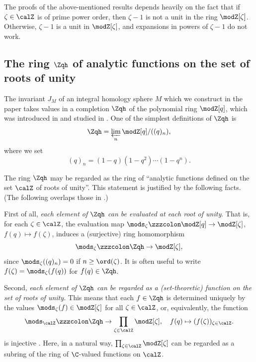 \documentclass{amsart}
\numberwithin{equation}{section}
\numberwithin{figure}{section}
\theoremstyle{plain}
\theoremstyle{definition}
\theoremstyle{remark}
\begin{document}
The proofs of the above-mentioned results depends heavily on the fact
that if $\zeta \in \calZ$ is of prime power order, then $\zeta -1$ is not a unit
in the ring $\modZ [\zeta ]$.  Otherwise, $\zeta -1$ is a unit in $\modZ [\zeta ]$, and
expansions in powers of $\zeta -1$ do not work.

\subsection{The ring $\Zqh$ of analytic functions on the
  set of roots of unity}
\label{sec:ring-zqh-cyclotomic}

The invariant $J_M$ of an integral homology sphere $M$ which we
construct in the paper takes values in a completion $\Zqh$ of the
polynomial ring $\modZ [q]$, which was introduced in \cite{H:rims2001} and
studied in \cite{H:cyclotomic}.  One of the simplest definitions of
$\Zqh$ is
\begin{equation*}
  \Zqh = \varprojlim_{n}\modZ [q]/((q)_n),
\end{equation*}
where we set
\begin{equation*}
  (q)_n = (1-q)(1-q^2)\cdots(1-q^n).
\end{equation*}

The ring $\Zqh$ may be regarded as the ring of ``analytic functions
defined on the set $\calZ$ of roots of unity''.  This statement is
justified by the following facts.  (The following overlaps those in
\cite{H:rims2001,H:cyclotomic}.)

First of all, {\em each element of $\Zqh$ can be evaluated at each
root of unity}.  That is, for each $\zeta \in \calZ$, the evaluation map
$\mods _\zeta \zzzcolon \modZ [q]\rightarrow \modZ [\zeta ]$, $f(q)\mapsto f(\zeta )$, induces a (surjective)
ring homomorphism
\begin{equation*}
  \mods _\zeta \zzzcolon \Zqh\rightarrow \modZ [\zeta ],
\end{equation*}
since $\mods _\zeta ((q)_n)=0$ if $n\ge \ord(\zeta )$.  It is often useful to write
$f(\zeta )=\mods _\zeta (f(q))$ for $f(q)\in \Zqh$.

Second, {\em each element of $\Zqh$ can be regarded as a
 (set-theoretic) function on the set of roots of unity.}  This means
 that each $f\in \Zqh$ is determined uniquely by the values
 $\mods _\zeta (f)\in \modZ [\zeta ]$ for all $\zeta \in \calZ$, or, equivalently, the
 function
\begin{equation}
  \label{e4}
  \mods _{\calZ}\zzzcolon \Zqh\rightarrow \prod_{\zeta \in \calZ}\modZ [\zeta ],\quad
  f(q)\mapsto (f(\zeta ))_{\zeta \in \calZ}.
\end{equation}
is injective \cite[Theorem 6.3]{H:cyclotomic}.  Here, in a natural
way, $\prod_{\zeta \in \calZ}\modZ [\zeta ]$ can be regarded as a subring of the
ring of $\C$-valued functions on $\calZ$.
\end{document}
